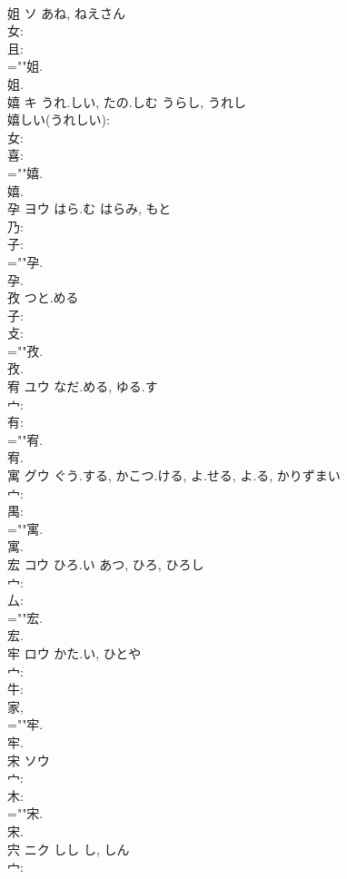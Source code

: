 \documentclass[8pt]{extreport}
\begin{document}
\begin{CJK}{UTF8}{min}
\\	姐	ソ	あね, ねえさん		
\\	女: 
\\	且: 
\\	=""姐.
\\	姐.
\\	嬉	キ	うれ.しい, たの.しむ	うらし, うれし	
\\	嬉しい(うれしい): 
\\	女: 
\\	喜: 
\\	=""嬉.
\\	嬉.
\\	孕	ヨウ	はら.む	はらみ, もと	
\\	乃: 
\\	子: 
\\	=""孕.
\\	孕.
\\	孜		つと.める				
\\	子: 
\\	攴: 
\\	=""孜.
\\	孜.
\\	宥	ユウ	なだ.める, ゆる.す		
\\	宀: 
\\	有: 
\\	=""宥.
\\	宥.
\\	寓	グウ	ぐう.する, かこつ.ける, よ.せる, よ.る, かりずまい		
\\	宀: 
\\	禺: 
\\	=""寓.
\\	寓.
\\	宏	コウ	ひろ.い	あつ, ひろ, ひろし	
\\	宀: 
\\	厶: 
\\	=""宏.
\\	宏.
\\	牢	ロウ	かた.い, ひとや		
\\	宀: 
\\	牛: 
\\	家, 
\\	=""牢.
\\	牢.
\\	宋	ソウ			
\\	宀: 
\\	木: 
\\	=""宋.
\\	宋.
\\	宍	ニク	しし	し, しん	
\\	宀: 

\end{CJK}
\end{document}
